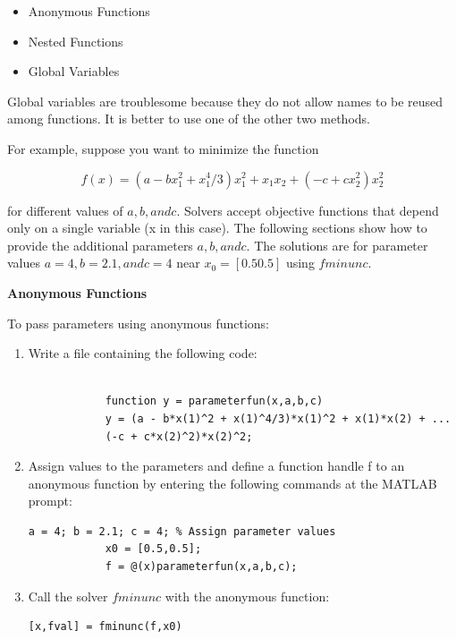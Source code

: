 \documentclass[10pt,math=newtx,citestyle=gb7714-2015,bibstyle=gb7714-2015]{elegantbook}
\begin{document}
{{{	\begin{itemize}
		\item Anonymous Functions
		
		\item Nested Functions
		
		\item Global Variables
		
		
	\end{itemize}
	
	Global variables are troublesome because they do not allow names to be reused among functions. It is better to use one of the other two methods.
	
	For example, suppose you want to minimize the function
	
	$$f(x)=(a-bx_1^2+x_1^4/3)x_1^2+x_1x_2+(-c+cx_2^2)x_2^2$$
	
	for different values of $a, b, and c$. Solvers accept objective functions that depend only on a single variable (x in this case). The following sections show how to provide the additional parameters $a, b, and c$. The solutions are for parameter values $a = 4, b = 2.1, and c = 4$ near $x_0 = [0.5 0.5]$ using $fminunc$.
	
	\textbf{Anonymous Functions}
	
	To pass parameters using anonymous functions:
	
	\begin{enumerate}
		\item Write a file containing the following code:
		\begin{lstlisting}[frame=shadowbox]
			
			function y = parameterfun(x,a,b,c)
			y = (a - b*x(1)^2 + x(1)^4/3)*x(1)^2 + x(1)*x(2) + ...
			(-c + c*x(2)^2)*x(2)^2;
		\end{lstlisting}
		
		\item Assign values to the parameters and define a function handle f to an anonymous function by entering the following commands at the MATLAB prompt:
		\begin{lstlisting}[frame=shadowbox]
			a = 4; b = 2.1; c = 4; % Assign parameter values
			x0 = [0.5,0.5];
			f = @(x)parameterfun(x,a,b,c);
		\end{lstlisting}
		
		\item Call the solver $fminunc$ with the anonymous function:
		\begin{lstlisting}[frame=shadowbox]
			[x,fval] = fminunc(f,x0)
		\end{lstlisting}
	\end{enumerate}
	
}}}
\end{document}
